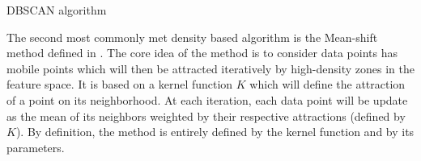 \documentclass[a4paper]{report}
\begin{document}
    \begin{algorithm}
        \caption{DBSCAN algorithm}
        \label{alg:dbscan}

    \end{algorithm}

    The second most commonly met density based algorithm is the Mean-shift method defined in \cite{cheng1995mean}. The core idea of the method is to consider data points has mobile points which will then be attracted iteratively by high-density zones in the feature space. It is based on a kernel function $K$ which will define the attraction of a point on its neighborhood. At each iteration, each data point will be update as the mean of its neighbors weighted by their respective attractions (defined by $K$). By definition, the method is entirely defined by the kernel function and by its parameters.
\end{document}

